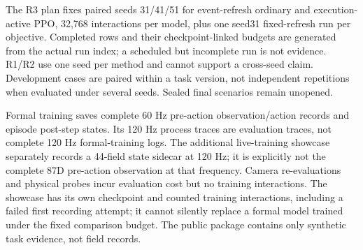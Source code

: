 The R3 plan fixes paired seeds 31/41/51 for event-refresh ordinary and execution-active PPO, 32,768 interactions per model, plus one seed31 fixed-refresh run per objective. Completed rows and their checkpoint-linked budgets are generated from the actual run index; a scheduled but incomplete run is not evidence. R1/R2 use one seed per method and cannot support a cross-seed claim. Development cases are paired within a task version, not independent repetitions when evaluated under several seeds. Sealed final scenarios remain unopened.

Formal training saves complete 60 Hz pre-action observation/action records and episode post-step states. Its 120 Hz process traces are evaluation traces, not complete 120 Hz formal-training logs. The additional live-training showcase separately records a 44-field state sidecar at 120 Hz; it is explicitly not the complete 87D pre-action observation at that frequency. Camera re-evaluations and physical probes incur evaluation cost but no training interactions. The showcase has its own checkpoint and counted training interactions, including a failed first recording attempt; it cannot silently replace a formal model trained under the fixed comparison budget. The public package contains only synthetic task evidence, not field records.
